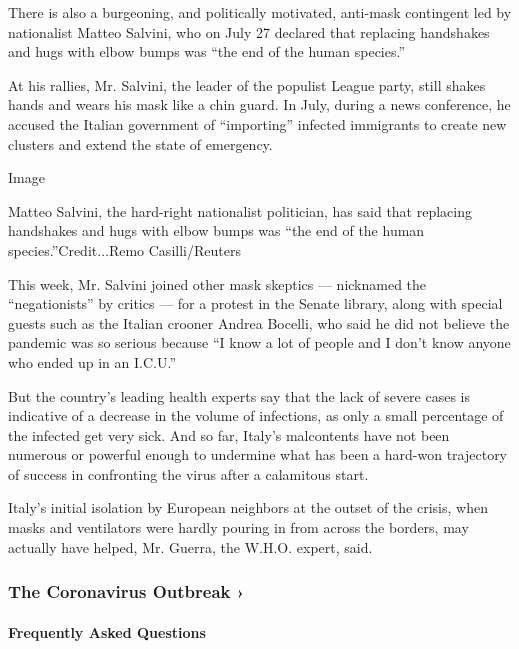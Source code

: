 There is also a burgeoning, and politically motivated, anti-mask
contingent led by nationalist Matteo Salvini, who on July 27 declared
that replacing handshakes and hugs with elbow bumps was ``the end of the
human species.''

At his rallies, Mr. Salvini, the leader of the populist League party,
still shakes hands and wears his mask like a chin guard. In July, during
a news conference, he accused the Italian government of ``importing''
infected immigrants to create new clusters and extend the state of
emergency.

Image

Matteo Salvini, the hard-right nationalist politician, has said that
replacing handshakes and hugs with elbow bumps was ``the end of the
human species.''Credit...Remo Casilli/Reuters

This week, Mr. Salvini joined other mask skeptics --- nicknamed the
``negationists'' by critics --- for a protest in the Senate library,
along with special guests such as the Italian crooner Andrea Bocelli,
who said he did not believe the pandemic was so serious because ``I know
a lot of people and I don't know anyone who ended up in an I.C.U.''

But the country's leading health experts say that the lack of severe
cases is indicative of a decrease in the volume of infections, as only a
small percentage of the infected get very sick. And so far, Italy's
malcontents have not been numerous or powerful enough to undermine what
has been a hard-won trajectory of success in confronting the virus after
a calamitous start.

Italy's initial isolation by European neighbors at the outset of the
crisis, when masks and ventilators were hardly pouring in from across
the borders, may actually have helped, Mr. Guerra, the W.H.O. expert,
said.

\href{https://www.nytimes.com/news-event/coronavirus?action=click\&pgtype=Article\&state=default\&region=MAIN_CONTENT_3\&context=storylines_faq}{}

\hypertarget{the-coronavirus-outbreak-}{%
\subsubsection{The Coronavirus Outbreak
›}\label{the-coronavirus-outbreak-}}

\hypertarget{frequently-asked-questions}{%
\paragraph{Frequently Asked
Questions}\label{frequently-asked-questions}}

